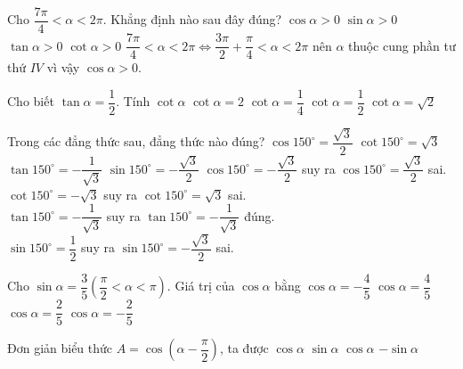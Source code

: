 \begin{ex}%
	Cho $\dfrac{7\pi}{4}<\alpha <2\pi $. Khẳng định  nào sau đây đúng?
	\choice
	{\True $\cos\alpha >0$}
	{$\sin\alpha >0$}
	{$\tan\alpha >0$}
	{$\cot\alpha >0$}
	\loigiai
	{$\dfrac{7\pi}{4}<\alpha <2\pi\Leftrightarrow\dfrac{3\pi}{2}+\dfrac{\pi}{4}<\alpha <2\pi $ nên $\alpha$ thuộc cung phần tư thứ $IV$ vì vậy $\cos\alpha >0$.}
\end{ex}



\begin{ex}%
	Cho biết $\tan\alpha=\dfrac{1}{2}$. Tính $\cot\alpha $
	\choice
	{\True $\cot\alpha=2$}
	{$\cot\alpha=\dfrac{1}{4}$}
	{$\cot\alpha=\dfrac{1}{2}$}
	{$\cot\alpha=\sqrt{2}$}
\end{ex}



\begin{ex}%
	Trong các đẳng thức sau, đẳng thức nào đúng?
	\choice
	{$\cos 150^\circ=\dfrac{\sqrt{3}}{2}$}
	{$\cot 150^\circ=\sqrt{3}$}
	{\True $\tan 150^\circ=-\dfrac{1}{\sqrt{3}}$}
	{$\sin 150^\circ=-\dfrac{\sqrt{3}}{2}$}
	\loigiai
	{	$\cos 150^\circ=-\dfrac{\sqrt{3}}{2}$ suy ra $\cos 150^\circ=\dfrac{\sqrt{3}}{2}$ sai.\\
		$\cot 150^\circ=-\sqrt{3}$ suy ra $\cot 150^\circ=\sqrt{3}$ sai.\\
		$\tan 150^\circ=-\dfrac{1}{\sqrt{3}}$ suy ra $\tan 150^\circ=-\dfrac{1}{\sqrt{3}}$ đúng.\\
		$\sin 150^\circ=\dfrac{1}{2}$ suy ra $\sin 150^\circ=-\dfrac{\sqrt{3}}{2}$ sai.}
\end{ex}



\begin{ex}%
	Cho $\sin\alpha=\dfrac{3}{5}\left(\dfrac{\pi}{2}<\alpha <\pi\right)$. Giá trị của $\cos\alpha $ bằng
	\choice
	{\True $\cos\alpha=-\dfrac{4}{5}$}
	{$\cos\alpha=\dfrac{4}{5}$}
	{$\cos\alpha=\dfrac{2}{5}$}
	{$\cos\alpha=-\dfrac{2}{5}$}
\end{ex}



\begin{ex}%
	Đơn giản biểu thức $ A=\cos\left(\alpha-\dfrac{\pi}{2}\right)$, ta được
	\choice
	{$\cos\alpha $}
	{\True $\sin\alpha $}
	{$\cos\alpha $}
	{$-\sin\alpha $}
\end{ex}



